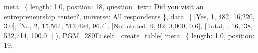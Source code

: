 \documentclass[
  11pt,
  a4paper,
]{article}
\newenvironment{Shaded}{\begin{snugshade}}{\end{snugshade}}
\newcommand{\NormalTok}[1]{\textcolor[rgb]{0.00,0.23,0.31}{#1}}
\newcommand{\OperatorTok}[1]{\textcolor[rgb]{0.37,0.37,0.37}{#1}}
\newcommand{\StringTok}[1]{\textcolor[rgb]{0.13,0.47,0.30}{#1}}
\newcommand{\VariableTok}[1]{\textcolor[rgb]{0.07,0.07,0.07}{#1}}
\begin{document}
\begin{Shaded}
\begin{Highlighting}[]
\NormalTok{                meta}\OperatorTok{=}\NormalTok{\{}
                    \StringTok{\textquotesingle{}length\textquotesingle{}}\NormalTok{: }\StringTok{\textquotesingle{}1.0\textquotesingle{}}\NormalTok{, }\StringTok{\textquotesingle{}position\textquotesingle{}}\NormalTok{: }\StringTok{\textquotesingle{}18\textquotesingle{}}\NormalTok{,}
                    \StringTok{\textquotesingle{}question\_text\textquotesingle{}}\NormalTok{: }\StringTok{\textquotesingle{}Did you visit an entrepreneurship center?\textquotesingle{}}\NormalTok{,}
                    \StringTok{\textquotesingle{}universe\textquotesingle{}}\NormalTok{: }\StringTok{\textquotesingle{}All respondents\textquotesingle{}}
\NormalTok{                \},}
\NormalTok{                data}\OperatorTok{=}\NormalTok{[}
\NormalTok{                    [}\StringTok{\textquotesingle{}Yes\textquotesingle{}}\NormalTok{, }\StringTok{\textquotesingle{}1\textquotesingle{}}\NormalTok{, }\StringTok{\textquotesingle{}482\textquotesingle{}}\NormalTok{, }\StringTok{\textquotesingle{}16,220\textquotesingle{}}\NormalTok{, }\StringTok{\textquotesingle{}3.0\textquotesingle{}}\NormalTok{],}
\NormalTok{                    [}\StringTok{\textquotesingle{}No\textquotesingle{}}\NormalTok{, }\StringTok{\textquotesingle{}2\textquotesingle{}}\NormalTok{, }\StringTok{\textquotesingle{}15,564\textquotesingle{}}\NormalTok{, }\StringTok{\textquotesingle{}513,494\textquotesingle{}}\NormalTok{, }\StringTok{\textquotesingle{}96.4\textquotesingle{}}\NormalTok{],}
\NormalTok{                    [}\StringTok{\textquotesingle{}Not stated\textquotesingle{}}\NormalTok{, }\StringTok{\textquotesingle{}9\textquotesingle{}}\NormalTok{, }\StringTok{\textquotesingle{}92\textquotesingle{}}\NormalTok{, }\StringTok{\textquotesingle{}3,000\textquotesingle{}}\NormalTok{, }\StringTok{\textquotesingle{}0.6\textquotesingle{}}\NormalTok{],}
\NormalTok{                    [}\StringTok{\textquotesingle{}Total\textquotesingle{}}\NormalTok{, }\StringTok{\textquotesingle{}\textquotesingle{}}\NormalTok{, }\StringTok{\textquotesingle{}16,138\textquotesingle{}}\NormalTok{, }\StringTok{\textquotesingle{}532,714\textquotesingle{}}\NormalTok{, }\StringTok{\textquotesingle{}100.0\textquotesingle{}}\NormalTok{]}
\NormalTok{                ]}
\NormalTok{            ),}
            \StringTok{\textquotesingle{}PGM\_280E\textquotesingle{}}\NormalTok{: }\VariableTok{self}\NormalTok{.\_create\_table(}
\NormalTok{                meta}\OperatorTok{=}\NormalTok{\{}
                    \StringTok{\textquotesingle{}length\textquotesingle{}}\NormalTok{: }\StringTok{\textquotesingle{}1.0\textquotesingle{}}\NormalTok{, }\StringTok{\textquotesingle{}position\textquotesingle{}}\NormalTok{: }\StringTok{\textquotesingle{}19\textquotesingle{}}\NormalTok{,}

\end{Highlighting}
\end{Shaded}
\end{document}
